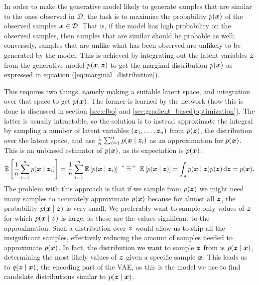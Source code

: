 In order to make the generative model likely to generate samples that are similar to the ones observed in $\mathcal{D}$, the task is to maximize the probability $p(\bm{ x })$ of the observed samples $\bm{ x } \in \mathcal{D}$. That is, if the model has high probability on the observed samples, then samples that are similar should be probable as well; conversely, samples that are unlike what has been observed are unlikely to be generated by the model. This is achieved by integrating out the latent variables $\bm{ z }$ from the generative model $p(\bm{ x }, \bm{ z })$ to get the marginal distribution $p(\bm{ x })$ as expressed in equation (\ref{eq:marginal_distribution}).

This requires two things, namely making a suitable latent space, and integration over that space to get $p(\bm{ x })$. The former is learned by the network (how this is done is discussed in section \ref{sec:elbo} and \ref{sec:gradient_based)optimization}). The latter is usually intractable, so the solution is to instead approximate the integral by sampling a number of latent variables $(\bm{ z }_1, \ldots, \bm{ z }_n)$ from $p(\bm{ z })$, the distribution over the latent space, and use $\frac{1}{n}\sum_{i = 1}^n p(\bm{ x } \mid \bm{ z }_i)$ as an approximation for $p(\bm{ x })$. This is an unbiased estimator of $p(\bm{ x })$,  as its expectation is $p(\bm{ x })$:
\[ \E{\frac{1}{n}\sum_{i=1}^n p(\ve{x} \mid \ve{z}_i)} = \frac{1}{n}\sum_{i=1}^n \E{p(\ve{x} \mid \ve{z}_i)} \quad  \mathrel{\overset{\makebox[0pt]{\mbox{\normalfont\tiny\sffamily $n \rightarrow \infty$}}}{=}} \quad \E{p(\ve{x} \mid \ve{z})} = \int_{\ve{z}} \pxz\pz \diff \ve{z} = \px. \]
The problem with this approach is that if we sample from $p(\bm{ z })$ we might need many samples to accurately approximate $p(\bm{ x })$ because for almost all $\bm{ z }$, the probability $p(\bm{ x } \mid \bm{ z })$ is very small. We preferably want to sample only values of $\bm{ z }$ for which $p(\bm{ x } \mid \bm{ z })$ is large, as these are the values significant to the approximation. Such a distribution over $\bm{ z }$ would allow us to skip all the insignificant samples, effectively reducing the amount of samples needed to approximate $p(\bm{ x })$. In fact, the distribution we want to sample $\bm{ z }$ from is $p(\bm{ z } \mid \bm{ x })$, determining the most likely values of $\bm{ z }$ given a specific sample $\bm{ x }$. This leads us to $q(\bm{ z } \mid \bm{ x })$, the encoding part of the VAE, as this is the model we use to find candidate distributions similar to $p(\bm{ z } \mid \bm{ x })$.

